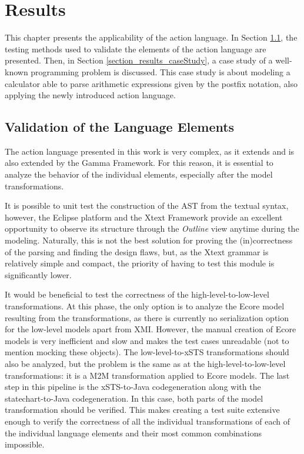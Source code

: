 \chapter{Results} \label{chapter_results}
This chapter presents the applicability of the action language. In Section \ref{section_results_validation}, the testing methods used to validate the elements of the action language are presented. Then, in Section \ref{section_results_caseStudy}, a case study of a well-known programming problem is discussed. This case study is about modeling a calculator able to parse arithmetic expressions given by the postfix notation, also applying the newly introduced action language.

\section{Validation of the Language Elements} \label{section_results_validation}
The action language presented in this work is very complex, as it extends and is also extended by the Gamma Framework. For this reason, it is essential to analyze the behavior of the individual elements, especially after the model transformations.

It is possible to unit test the construction of the AST from the textual syntax, however, the Eclipse platform and the Xtext Framework provide an excellent opportunity to observe its structure through the \textit{Outline} view anytime during the modeling. Naturally, this is not the best solution for proving the (in)correctness of the parsing and finding the design flaws, but, as the Xtext grammar is relatively simple and compact, the priority of having to test this module is significantly lower.

It would be beneficial to test the correctness of the high-level-to-low-level transformations. At this phase, the only option is to analyze the Ecore model resulting from the transformations, as there is currently no serialization option for the low-level models apart from XMI. However, the manual creation of Ecore models is very inefficient and slow and makes the test cases unreadable (not to mention mocking these objects). The low-level-to-xSTS transformations should also be analyzed, but the problem is the same as at the high-level-to-low-level transformations: it is a M2M transformation applied to Ecore models. The last step in this pipeline is the xSTS-to-Java codegeneration along with the statechart-to-Java codegeneration. In this case, both parts of the model transformation should be verified. This makes creating a test suite extensive enough to verify the correctness of all the individual transformations of each of the individual language elements and their most common combinations impossible.

